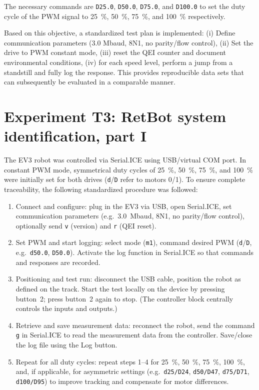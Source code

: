 \documentclass[12pt, oneside, a4paper]{scrreprt}
\begin{document}
            The necessary commands are \texttt{D25.0}, \texttt{D50.0}, \texttt{D75.0}, and \texttt{D100.0} to set the duty cycle of the PWM signal to \SI{25}{\percent}, \SI{50}{\percent}, \SI{75}{\percent}, and \SI{100}{\percent} respectively.

            Based on this objective, a standardized test plan is implemented: (i) Define communication parameters (3.0 Mbaud, 8N1, no parity/flow control), (ii) Set the drive to PWM constant mode, (iii) reset the QEI counter and document environmental conditions, (iv) for each speed level, perform a jump from a standstill and fully log the response. This provides reproducible data sets that can subsequently be evaluated in a comparable manner.

            \cleardoublepage




    \chapter{Experiment T3: RetBot system identification, part I}\label{ch:ExperimentT3}
        The EV3 robot was controlled via Serial.ICE using USB/virtual COM port. In constant PWM mode, symmetrical duty cycles of \SI{25}{\percent}, \SI{50}{\percent}, \SI{75}{\percent}, and \SI{100}{\percent} were initially set for both drives (\texttt{d}/\texttt{D} refer to motors 0/1). To ensure complete traceability, the following standardized procedure was followed:

        \begin{enumerate}
            \item Connect and configure: plug in the EV3 via USB, open Serial.ICE, set communication parameters (e.g.\ \SI{3.0}{Mbaud}, 8N1, no parity/flow control), optionally send \texttt{v} (version) and \texttt{r} (QEI reset).
            \item Set PWM and start logging: select mode (\texttt{m1}), command desired PWM (\texttt{d}/\texttt{D}, e.g.\ \texttt{d50.0}, \texttt{D50.0}). Activate the log function in Serial.ICE so that commands and responses are recorded.
            \item Positioning and test run: disconnect the USB cable, position the robot as defined on the track. Start the test locally on the device by pressing button~2; press button~2 again to stop. (The controller block centrally controls the inputs and outputs.)
            \item Retrieve and save measurement data: reconnect the robot, send the command \texttt{g} in Serial.ICE to read the measurement data from the controller. Save/close the log file using the Log button.
            \item Repeat for all duty cycles: repeat steps \numrange{1}{4} for \SI{25}{\percent}, \SI{50}{\percent}, \SI{75}{\percent}, \SI{100}{\percent}, and, if applicable, for asymmetric settings (e.g.\ \texttt{d25/D24}, \texttt{d50/D47}, \texttt{d75/D71}, \texttt{d100/D95}) to improve tracking and compensate for motor differences.
        \end{enumerate}
\end{document}
